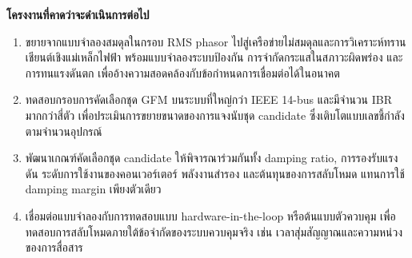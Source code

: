\documentclass[12pt,a4paper]{article}
\newcommand{\templateheading}[1]{%
  \par\addvspace{0.85em}\noindent
  {\fontsize{19}{21}\selectfont\bfseries #1}\par
  \vspace{0.10em}\noindent{\color{academicblue}\rule{\textwidth}{0.9pt}}\par
  \vspace{0.30em}}
\begin{document}
\templateheading{โครงงานที่คาดว่าจะดำเนินการต่อไป}
\begin{enumerate}
\item ขยายจากแบบจำลองสมดุลในกรอบ RMS phasor ไปสู่เครือข่ายไม่สมดุลและการวิเคราะห์ทรานเชียนต์เชิงแม่เหล็กไฟฟ้า พร้อมแบบจำลองระบบป้องกัน การจำกัดกระแสในสภาวะผิดพร่อง และการทนแรงดันตก เพื่ออ้างความสอดคล้องกับข้อกำหนดการเชื่อมต่อได้ในอนาคต
\item ทดสอบกรอบการคัดเลือกชุด GFM บนระบบที่ใหญ่กว่า IEEE 14-bus และมีจำนวน IBR มากกว่าสี่ตัว เพื่อประเมินการขยายขนาดของการแจงนับชุด candidate ซึ่งเติบโตแบบเลขชี้กำลังตามจำนวนอุปกรณ์
\item พัฒนาเกณฑ์คัดเลือกชุด candidate ให้พิจารณาร่วมกันทั้ง damping ratio, การรองรับแรงดัน ระดับการใช้งานของคอนเวอร์เตอร์ พลังงานสำรอง และต้นทุนของการสลับโหมด แทนการใช้ damping margin เพียงตัวเดียว
\item เชื่อมต่อแบบจำลองกับการทดสอบแบบ hardware-in-the-loop หรือต้นแบบตัวควบคุม เพื่อทดสอบการสลับโหมดภายใต้ข้อจำกัดของระบบควบคุมจริง เช่น เวลาสุ่มสัญญาณและความหน่วงของการสื่อสาร
\end{enumerate}
\end{document}
